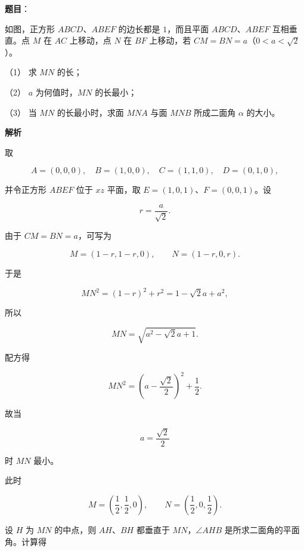 \begin{answer}

\textbf{题目}：

如图，正方形 $ABCD\text{、}ABEF$ 的边长都是 $1$，而且平面 $ABCD\text{、}ABEF$ 互相垂直。点 $M$ 在 $AC$ 上移动，点 $N$ 在 $BF$ 上移动，若 $CM=BN=a$（$0<a<\sqrt2$）。
\nopagebreak[4]
\begin{center}\end{center}
\nopagebreak[4]
（1） 求 $MN$ 的长；

（2） $a$ 为何值时，$MN$ 的长最小；

（3） 当 $MN$ 的长最小时，求面 $MNA$ 与面 $MNB$ 所成二面角 $\alpha$ 的大小。

\textbf{解析}

取

\nopagebreak[4]
\[
A=(0,0,0),\quad B=(1,0,0),\quad C=(1,1,0),\quad D=(0,1,0),
\]

并令正方形 $ABEF$ 位于 $xz$ 平面，取 $E=(1,0,1)$、$F=(0,0,1)$。设

\nopagebreak[4]
\[
r=\frac{a}{\sqrt2}.
\]

由于 $CM=BN=a$，可写为

\nopagebreak[4]
\[
M=(1-r,1-r,0),\qquad
N=(1-r,0,r).
\]


于是

\nopagebreak[4]
\[
MN^2=(1-r)^2+r^2
=1-\sqrt2a+a^2,
\]

所以

\nopagebreak[4]
\[
MN=\sqrt{a^2-\sqrt2a+1}.
\]


配方得

\nopagebreak[4]
\[
MN^2=\left(a-\frac{\sqrt2}{2}\right)^2+\frac12.
\]

故当

\nopagebreak[4]
\[
a=\frac{\sqrt2}{2}
\]

时 $MN$ 最小。


此时

\nopagebreak[4]
\[
M=\left(\frac12,\frac12,0\right),\qquad
N=\left(\frac12,0,\frac12\right).
\]

设 $H$ 为 $MN$ 的中点，则 $AH$、$BH$ 都垂直于 $MN$，$\angle AHB$ 是所求二面角的平面角。计算得


\end{answer}
